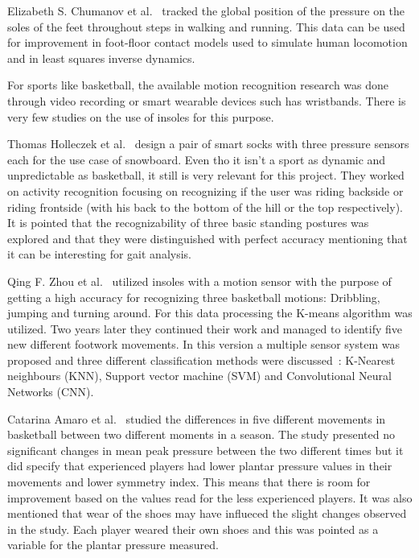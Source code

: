 Elizabeth S. Chumanov et al.~\cite{posDuringWalking} tracked the global position of the pressure on the soles of the feet throughout steps in walking and running. This data can be used 
for improvement in foot-floor contact models used to simulate human locomotion and in least squares inverse dynamics.


For sports like basketball, the available motion recognition research was done through video recording or smart wearable devices such has wristbands. There is very few studies on the 
use of insoles for this purpose. 

Thomas Holleczek et al.~\cite{snowboard} design a pair of smart socks with three pressure sensors each for the use case of snowboard. Even tho it isn't a sport as dynamic and unpredictable 
as basketball, it still is very relevant for this project. They worked on activity recognition focusing on recognizing if the user was riding backside or riding frontside (with his 
back to the bottom of the hill or the top respectively). It is pointed that the recognizability of three basic standing postures was explored and that they were distinguished with perfect accuracy 
mentioning that it can be interesting for gait analysis.


Qing F. Zhou et al.~\cite{basketballMotions} utilized insoles with a motion sensor with the purpose of getting a high accuracy for recognizing three basketball motions: 
Dribbling, jumping and turning around. For this data processing the K-means algorithm was utilized. 
Two years later they continued their work and managed to identify five new different 
footwork movements. In this version a multiple sensor system was proposed and three different classification methods were discussed~\cite{basketballFootwork}:
K-Nearest neighbours (KNN), Support vector machine (SVM) and Convolutional Neural Networks (CNN).


Catarina Amaro et al.~\cite{coimbra} studied the differences in five different movements in basketball between two different moments in a season. The study presented no significant 
changes in mean peak pressure between the two different times but it did specify that experienced players had lower plantar pressure values in their movements and lower symmetry index. This means that there 
is room for improvement based on the values read for the less experienced players. It was also mentioned that wear of the shoes may have influeced the slight changes observed in the study. 
Each player weared their own shoes and this was pointed as a variable for the plantar pressure measured.

